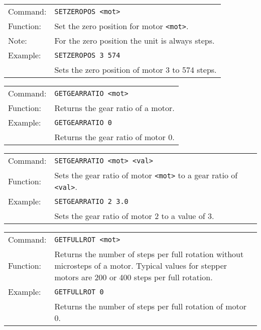 \vspace{\vdistace}

\begin{table}[!htbp]
  \begin{tabularx}{\textwidth}{lX}
    Command:  & \texttt{SETZEROPOS <mot>}\\
    Function: & Set the zero position for motor \texttt{<mot>}.\\
    Note:     & For the zero position the unit is always steps.\\
    Example:  & \texttt{SETZEROPOS 3 574}\\
              & Sets the zero position of motor 3 to 574 steps.
  \end{tabularx}
\end{table}

\vspace{\vdistace}

\begin{table}[!htbp]
  \begin{tabularx}{\textwidth}{lX}
    Command:  & \texttt{GETGEARRATIO <mot>}\\
    Function: & Returns the gear ratio of a motor.\\
    Example:  & \texttt{GETGEARRATIO 0}\\
              & Returns the gear ratio of motor 0.
  \end{tabularx}
\end{table}

\vspace{\vdistace}

\begin{table}[!htbp]
  \begin{tabularx}{\textwidth}{lX}
    Command:  & \texttt{SETGEARRATIO <mot> <val>}\\
    Function: & Sets the gear ratio of motor \texttt{<mot>} to a gear ratio
                of \texttt{<val>}.\\
    Example:  & \texttt{SETGEARRATIO 2 3.0}\\
              & Sets the gear ratio of motor 2 to a value of 3.
  \end{tabularx}
\end{table}

\vspace{\vdistace}

\begin{table}[!htbp]
  \begin{tabularx}{\textwidth}{lX}
    Command:  & \texttt{GETFULLROT <mot>}\\
    Function: & Returns the number of steps per full rotation without microsteps of a motor. Typical values for stepper motors are 200 or 400 steps per full rotation.\\
    Example:  & \texttt{GETFULLROT 0}\\
              & Returns the number of steps per full rotation of motor 0.
  \end{tabularx}
\end{table}

